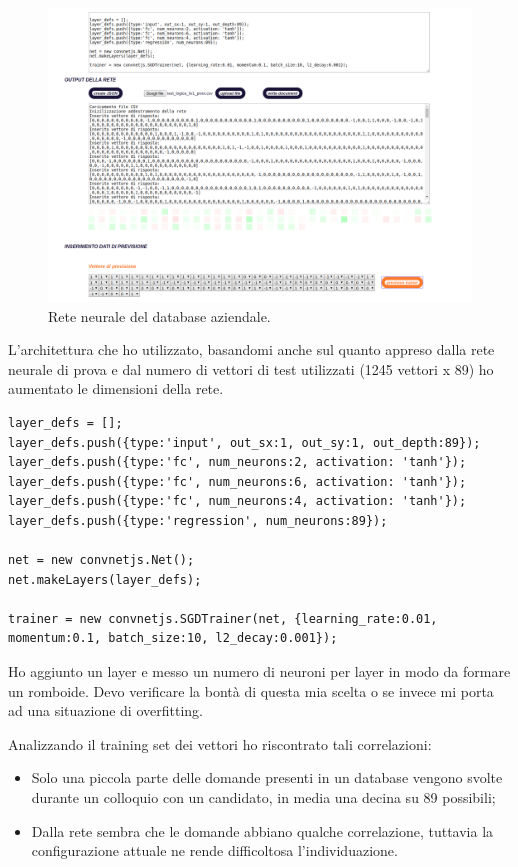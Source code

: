 \begin{figure}[H]
\centering
	\includegraphics[width=0.90\linewidth]{./image/rete_db.png}
	\caption{Rete neurale del database aziendale.}
\end{figure}
\noindent
L'architettura che ho utilizzato, basandomi anche sul quanto appreso dalla rete neurale di prova e dal numero di vettori di test utilizzati (1245 vettori x 89) ho aumentato le dimensioni della rete.
\begin{verbatim}
layer_defs = [];
layer_defs.push({type:'input', out_sx:1, out_sy:1, out_depth:89});
layer_defs.push({type:'fc', num_neurons:2, activation: 'tanh'});
layer_defs.push({type:'fc', num_neurons:6, activation: 'tanh'});
layer_defs.push({type:'fc', num_neurons:4, activation: 'tanh'});
layer_defs.push({type:'regression', num_neurons:89});

net = new convnetjs.Net();
net.makeLayers(layer_defs);

trainer = new convnetjs.SGDTrainer(net, {learning_rate:0.01,
momentum:0.1, batch_size:10, l2_decay:0.001});
\end{verbatim}
Ho aggiunto un layer e messo un numero di neuroni per layer in modo da formare un romboide. Devo verificare la bont\`a di questa mia scelta o se invece mi porta ad una situazione di overfitting.

\noindent
Analizzando il training set dei vettori ho riscontrato tali correlazioni:
\begin{itemize}
\item Solo una piccola parte delle domande presenti in un database vengono svolte durante un colloquio con un candidato, in media una decina su 89 possibili;
\item Dalla rete sembra che le domande abbiano qualche correlazione, tuttavia la configurazione attuale ne rende difficoltosa l'individuazione.
\end{itemize}


